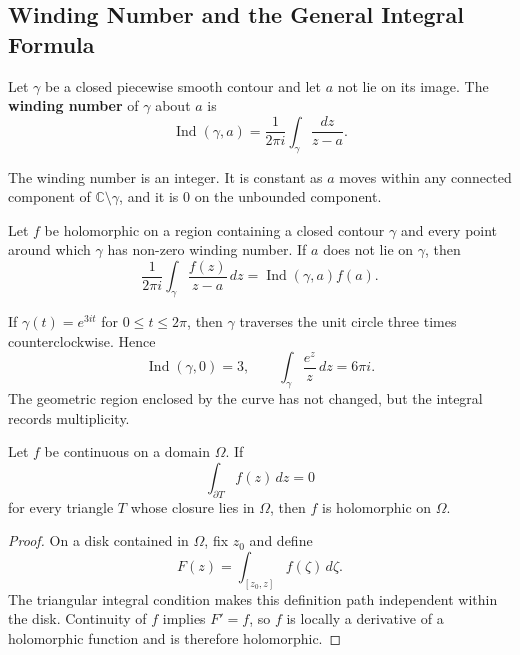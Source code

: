 \subsection{Winding Number and the General Integral Formula}

\begin{definition}
Let $\gamma$ be a closed piecewise smooth contour and let $a$ not lie on its image. The \textbf{winding number} of $\gamma$ about $a$ is
\[
    \operatorname{Ind}(\gamma,a)
    =\frac{1}{2\pi i}\int_\gamma\frac{dz}{z-a}.
\]
\end{definition}

\begin{proposition}
The winding number is an integer. It is constant as $a$ moves within any connected component of $\mathbb{C}\setminus\gamma$, and it is $0$ on the unbounded component.
\end{proposition}

\begin{theorem}
Let $f$ be holomorphic on a region containing a closed contour $\gamma$ and every point around which $\gamma$ has non-zero winding number. If $a$ does not lie on $\gamma$, then
\[
    \frac{1}{2\pi i}\int_\gamma\frac{f(z)}{z-a}\,dz
    =\operatorname{Ind}(\gamma,a)f(a).
\]
\end{theorem}

\begin{example}
If $\gamma(t)=e^{3it}$ for $0\leq t\leq2\pi$, then $\gamma$ traverses the unit circle three times counterclockwise. Hence
\[
    \operatorname{Ind}(\gamma,0)=3,
    \qquad
    \int_\gamma\frac{e^z}{z}\,dz=6\pi i.
\]
The geometric region enclosed by the curve has not changed, but the integral records multiplicity.
\end{example}

\begin{theorem}
Let $f$ be continuous on a domain $\Omega$. If
\[
    \int_{\partial T}f(z)\,dz=0
\]
for every triangle $T$ whose closure lies in $\Omega$, then $f$ is holomorphic on $\Omega$.
\end{theorem}

\begin{proof}
On a disk contained in $\Omega$, fix $z_0$ and define
\[
    F(z)=\int_{[z_0,z]}f(\zeta)\,d\zeta.
\]
The triangular integral condition makes this definition path independent within the disk. Continuity of $f$ implies $F'=f$, so $f$ is locally a derivative of a holomorphic function and is therefore holomorphic.
\end{proof}

